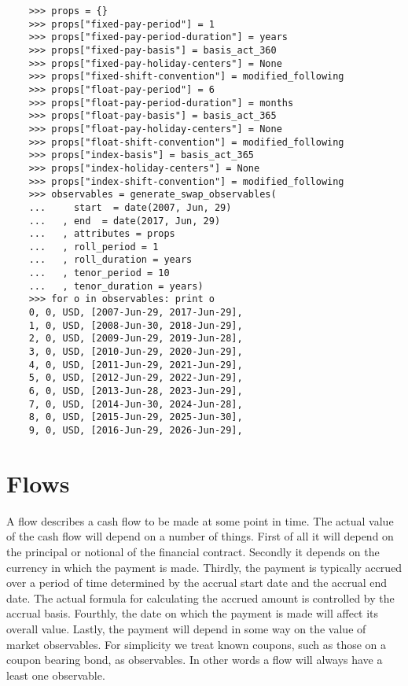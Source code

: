 \begin{verbatim}
    >>> props = {}
    >>> props["fixed-pay-period"] = 1
    >>> props["fixed-pay-period-duration"] = years
    >>> props["fixed-pay-basis"] = basis_act_360
    >>> props["fixed-pay-holiday-centers"] = None
    >>> props["fixed-shift-convention"] = modified_following
    >>> props["float-pay-period"] = 6
    >>> props["float-pay-period-duration"] = months
    >>> props["float-pay-basis"] = basis_act_365
    >>> props["float-pay-holiday-centers"] = None
    >>> props["float-shift-convention"] = modified_following
    >>> props["index-basis"] = basis_act_365
    >>> props["index-holiday-centers"] = None
    >>> props["index-shift-convention"] = modified_following
    >>> observables = generate_swap_observables(
    ...     start  = date(2007, Jun, 29)
    ...   , end  = date(2017, Jun, 29)
    ...   , attributes = props
    ...   , roll_period = 1
    ...   , roll_duration = years
    ...   , tenor_period = 10
    ...   , tenor_duration = years)
    >>> for o in observables: print o
    0, 0, USD, [2007-Jun-29, 2017-Jun-29], 
    1, 0, USD, [2008-Jun-30, 2018-Jun-29], 
    2, 0, USD, [2009-Jun-29, 2019-Jun-28], 
    3, 0, USD, [2010-Jun-29, 2020-Jun-29], 
    4, 0, USD, [2011-Jun-29, 2021-Jun-29], 
    5, 0, USD, [2012-Jun-29, 2022-Jun-29], 
    6, 0, USD, [2013-Jun-28, 2023-Jun-29], 
    7, 0, USD, [2014-Jun-30, 2024-Jun-28], 
    8, 0, USD, [2015-Jun-29, 2025-Jun-30], 
    9, 0, USD, [2016-Jun-29, 2026-Jun-29], 
\end{verbatim}

\section{Flows}\label{sec:flows}
A flow describes a cash flow to be made at some point in time. The actual value 
of the cash flow will depend on a number of things. First of all it will 
depend on the principal or notional of the financial contract. Secondly it 
depends on the currency in which the payment is made. Thirdly, the payment is 
typically accrued over a period of time determined by the accrual start date 
and the accrual end date. The actual formula for calculating the accrued amount is 
controlled by the accrual basis. Fourthly, the date on which the payment is made 
will affect its overall value. Lastly, the payment will depend in some way on 
the value of market observables. For simplicity we treat known coupons, such 
as those on a coupon bearing bond, as observables. In other words a flow will 
always have a least one observable.
  
